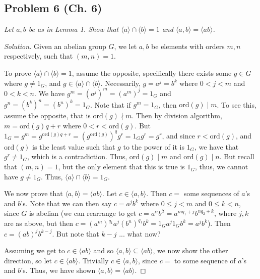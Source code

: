 \documentclass{article}
\begin{document}
\subsection*{Problem 6 (Ch. 6)}
{\it Let $a,b$ be as in Lemma 1.
Show that $\langle a \rangle \cap \langle b \rangle = 1$
and $\langle a,b \rangle = \langle ab \rangle$.}
\begin{proof}[Solution]\let\qed\relax
	Given an abelian group $G$,
	we let $a,b$ be elements with orders $m,n$ respectively,
	such that $(m,n) = 1$.
	
	To prove $\langle a \rangle \cap \langle b \rangle = 1$,
	assume the opposite, specifically
	there exists some $g \in G$ where $g \neq 1_G$,
	and $g \in \langle a \rangle \cap \langle b \rangle$.
	Necessarily, $g = a^{j} = b^{k}$ where $0 < j < m$ and $0 < k < n$.
	We have $g^m = (a^j)^m = (a^m)^j = 1_G$ and $g^n = (b^k)^n = (b^n)^k = 1_G$.
	Note that if $g^m = 1_G$, then $\mathrm{ord}(g) \mid m$.
	To see this, assume the opposite, that is $\mathrm{ord}(g) \nmid m$.
	Then by division algorithm, $m = \mathrm{ord}(g)q + r$ where $0 < r < \mathrm{ord}(g)$.
	But $1_G = g^m = g^{\mathrm{ord}(g)q + r} = (g^{\mathrm{ord}(g)})^qg^r = 1_Gg^r = g^r$,
	and since $r < \mathrm{ord}(g)$, and $\mathrm{ord}(g)$ is the least value
	such that $g$ to the power of it is $1_G$,
	we have that $g^r \neq 1_G$, which is a contradiction.
	Thus, $\mathrm{ord}(g) \mid m$ and $\mathrm{ord}(g) \mid n$.
	But recall that $(m,n) = 1$,
	but the only element that this is true is $1_G$,
	thus, we cannot have $g \neq 1_G$.
	Thus, $\langle a \rangle \cap \langle b \rangle = 1_G$.

	We now prove that $\langle a, b\rangle = \langle ab \rangle$.
	Let $c \in \langle a,b \rangle$.
	Then $c = $ some sequences of $a$'s and $b$'s.
	Note that we can then say $c = a^{j}b^{k}$ where $0 \leq j < m$
	and $0 \leq k < n$,
	since $G$ is abelian
	(we can rearrange to get $c = a^\alpha b^\beta = a^{mq_1 + j}b^{nq_2 + k}$,
	where $j,k$ are as above,
	but then $c = (a^m)^{q_1}a^j(b^n)^{q_1}b^k = 1_G a^j 1_G b^k = a^jb^k$).
	Then $c = (ab)^j b^{k-j}$.
	But note that $k - j$ ... what now?

	Assuming we get to $c \in \langle ab \rangle$ and so $\langle a,b \rangle \subseteq \langle ab \rangle$,
	we now show the other direction, so let $c \in \langle ab \rangle$.
	Trivially $c \in \langle a,b\rangle$, since
	$c = $ to some sequence of $a$'s and $b$'s.
	Thus, we have shown $\langle a,b \rangle = \langle ab \rangle$.
\end{proof}
\end{document}
